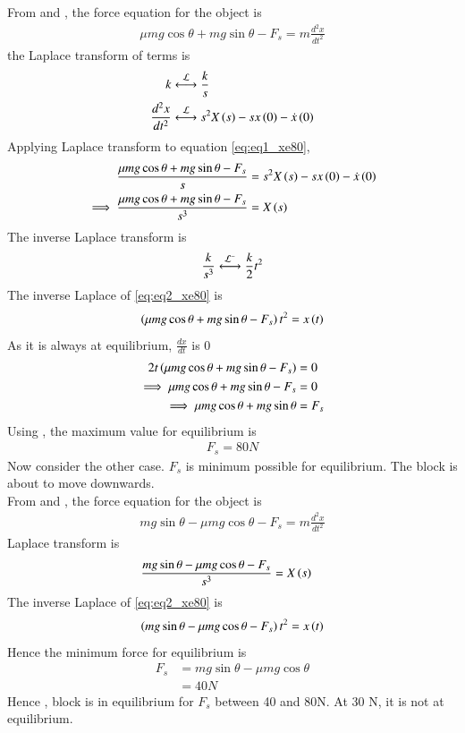 \documentclass[journal,12pt,twocolumn]{IEEEtran}
\theoremstyle{remark}
\begin{document}

From  and , the force equation for the object is 
\begin{align}
    \mu mg \cos{\theta} + mg \sin{\theta} - F_{s} = m \frac{d^2x}{dt^2} \label{eq:eq1_xe80}
\end{align}
the Laplace transform of terms is 
\begin{align}
    k & \system{\mathcal{L}} \frac{k}{s}\\
    \frac{d^2x}{dt^2} & \system{\mathcal{L}} s^2 X\brak{s} - sx\brak{0} - \dot{x}\brak{0}
\end{align}
Applying Laplace transform to equation \eqref{eq:eq1_xe80},
\begin{align}
    \frac{ \mu mg \cos{\theta} + mg \sin{\theta} - F_{s}}{s} &= s^2 X\left(s\right) - sx\left(0\right) - \dot{x}\left(0\right)\\
    \implies \frac{ \mu mg \cos{\theta} + mg \sin{\theta} - F_{s}}{s^3} &= X\left(s\right) \label{eq:eq2_xe80}
\end{align}
The inverse Laplace transform is 
\begin{align}
     \frac{k}{s^3} \system{\mathcal{L^{ -}}} \frac{k}{2} t^2
\end{align}
The inverse Laplace of \eqref{eq:eq2_xe80} is
\begin{align}
    \left(\mu mg \cos{\theta} + mg \sin{\theta} - F_{s}\right) t^2 = x\left(t\right)
\end{align}
As it is always at equilibrium, $\frac{dx}{dt}$ is 0\\
\begin{align}
    2t \left(\mu mg \cos{\theta} + mg \sin{\theta} - F_{s}\right) &= 0\\
    \implies \mu mg \cos{\theta} + mg \sin{\theta} - F_{s} &= 0\\
    \implies \mu mg \cos{\theta} + mg \sin{\theta} &= F_{s}
\end{align}
Using  , the maximum value for equilibrium is 
\begin{align}
    F_s = 80 N 
\end{align}
Now consider the other case. $F_s$ is minimum possible for equilibrium. The block is about to move downwards.\\

From  and , the force equation for the object is 
\begin{align}
     mg \sin{\theta} -\mu mg \cos{\theta} - F_{s} = m \frac{d^2x}{dt^2} \label{eq:eq3_xe80}
\end{align}
Laplace transform is 
\begin{align}
     \frac{ mg \sin{\theta} - \mu mg \cos{\theta} - F_{s}}{s^3} &= X\left(s\right)
\end{align}
The inverse Laplace of \eqref{eq:eq2_xe80} is
\begin{align}
    \left( mg \sin{\theta} -\mu mg \cos{\theta} - F_{s}\right) t^2 = x\left(t\right)
\end{align}
Hence the minimum force for equilibrium is
\begin{align}
    F_s &= mg \sin{\theta} - \mu mg \cos{\theta} \\
    &= 40 N
\end{align}
Hence , block is in equilibrium for $F_s$ between 40 and 80N. At 30 N, it is not at equilibrium.
\end{document}
